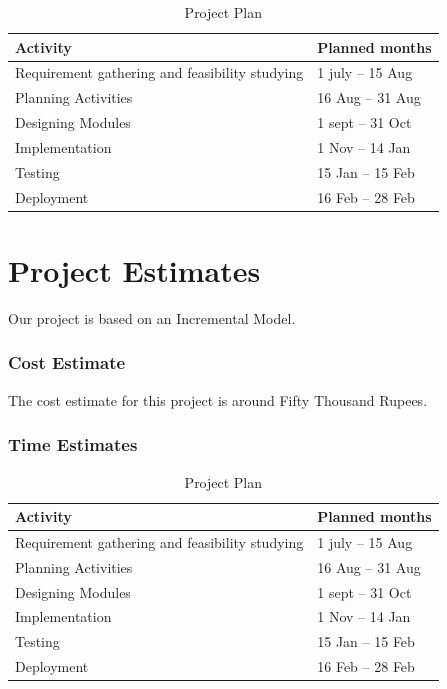 \documentclass[oneside,a4paper,12pt]{report}
\begin{document}
\begin{table}[!htbp]
\begin{center}
\def\arraystretch{1.5}
\begin{tabularx}{\textwidth}{| X | X |}
\hline
Activity	& Planned months\\
\hline
Requirement gathering and feasibility studying        &1 july – 15 Aug\\
\hline
Planning Activities       &16 Aug – 31 Aug\\
\hline
Designing Modules        &1 sept – 31 Oct\\
\hline
Implementation           &1 Nov – 14 Jan\\
\hline
Testing                  &15 Jan – 15 Feb\\
\hline
Deployment               &16 Feb – 28 Feb\\
\hline



\end{tabularx}
\end{center}
\caption{Project Plan }
\label{tab:usecase}
\end{table}


\section{Project Estimates}
 Our project is based on an Incremental Model. 
\subsubsection{Cost Estimate}
 The cost estimate for this project is around Fifty Thousand Rupees.

\subsubsection{Time Estimates}

\begin{table}[!htbp]
\begin{center}
\def\arraystretch{1.5}
\begin{tabularx}{\textwidth}{| X | X |}
\hline
Activity	& Planned months\\
\hline
Requirement gathering and feasibility studying        &1 july – 15 Aug\\
\hline
Planning Activities       &16 Aug – 31 Aug\\
\hline
Designing Modules        &1 sept – 31 Oct\\
\hline
Implementation           &1 Nov – 14 Jan\\
\hline
Testing                  &15 Jan – 15 Feb\\
\hline
Deployment               &16 Feb – 28 Feb\\
\hline



\end{tabularx}
\end{center}
\caption{Project Plan}
\label{tab:usecase}
\end{table}
\end{document}
